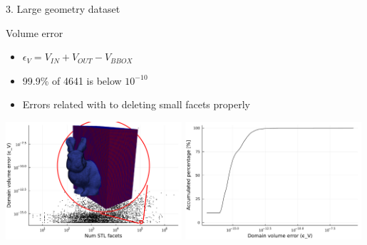 \documentclass{beamer}
\begin{document}
\begin{frame}{3. Large geometry dataset}

  \begin{block}{Volume error}
  \begin{itemize}
    \item
      $\epsilon_V = V_{IN} + V_{OUT} - V_{BBOX}$
    \item
      99.9\% of 4641 is below $10^{-10}$
    \item
      Errors related with to deleting small facets properly
  \end{itemize}
  \end{block}

  \includegraphics[width=0.49\textwidth]{num_stl_facets_volume_error_bunny}
  \includegraphics[width=0.49\textwidth]{../analysis/plots/histogram_volume_error}
\end{frame}
\end{document}
